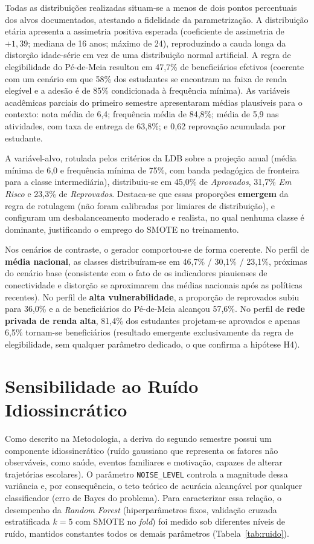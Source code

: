 Todas as distribuições realizadas situam-se a menos de dois pontos percentuais dos alvos documentados, atestando a fidelidade da parametrização. A distribuição etária apresenta a assimetria positiva esperada (coeficiente de assimetria de $+1{,}39$; mediana de 16 anos; máximo de 24), reproduzindo a cauda longa da distorção idade-série em vez de uma distribuição normal artificial. A regra de elegibilidade do Pé-de-Meia resultou em 47,7\% de beneficiários efetivos (coerente com um cenário em que 58\% dos estudantes se encontram na faixa de renda elegível e a adesão é de 85\% condicionada à frequência mínima). As variáveis acadêmicas parciais do primeiro semestre apresentaram médias plausíveis para o contexto: nota média de 6,4; frequência média de 84,8\%; média de 5,9 nas atividades, com taxa de entrega de 63,8\%; e 0,62 reprovação acumulada por estudante.

A variável-alvo, rotulada pelos critérios da LDB sobre a projeção anual (média mínima de 6,0 e frequência mínima de 75\%, com banda pedagógica de fronteira para a classe intermediária), distribuiu-se em 45,0\% de \textit{Aprovados}, 31,7\% \textit{Em Risco} e 23,3\% de \textit{Reprovados}. Destaca-se que essas proporções \textbf{emergem} da regra de rotulagem (não foram calibradas por limiares de distribuição), e configuram um desbalanceamento moderado e realista, no qual nenhuma classe é dominante, justificando o emprego do SMOTE no treinamento.

Nos cenários de contraste, o gerador comportou-se de forma coerente. No perfil de \textbf{média nacional}, as classes distribuíram-se em 46,7\% / 30,1\% / 23,1\%, próximas do cenário base (consistente com o fato de os indicadores piauienses de conectividade e distorção se aproximarem das médias nacionais após as políticas recentes). No perfil de \textbf{alta vulnerabilidade}, a proporção de reprovados subiu para 36,0\% e a de beneficiários do Pé-de-Meia alcançou 57,6\%. No perfil de \textbf{rede privada de renda alta}, 81,4\% dos estudantes projetam-se aprovados e apenas 6,5\% tornam-se beneficiários (resultado emergente exclusivamente da regra de elegibilidade, sem qualquer parâmetro dedicado, o que confirma a hipótese H4).

\section{Sensibilidade ao Ruído Idiossincrático}

Como descrito na Metodologia, a deriva do segundo semestre possui um componente idiossincrático (ruído gaussiano que representa os fatores não observáveis, como saúde, eventos familiares e motivação, capazes de alterar trajetórias escolares). O parâmetro \texttt{NOISE\_LEVEL} controla a magnitude dessa variância e, por consequência, o teto teórico de acurácia alcançável por qualquer classificador (erro de Bayes do problema). Para caracterizar essa relação, o desempenho da \textit{Random Forest} (hiperparâmetros fixos, validação cruzada estratificada $k=5$ com SMOTE no \textit{fold}) foi medido sob diferentes níveis de ruído, mantidos constantes todos os demais parâmetros (Tabela~\ref{tab:ruido}).

